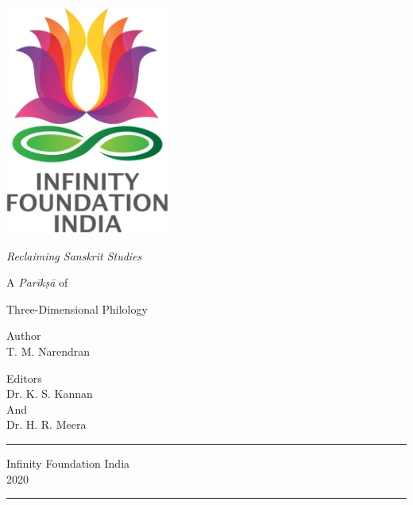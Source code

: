 \thispagestyle{empty}
\begin{center}
\includegraphics[scale=0.3]{images/logo.png}
\bigskip

{\fontsize{10}{14}\selectfont\sl
Reclaiming Sanskrit Studies
}

\bigskip
\end{center}
\medskip

\begin{center}
{{\fontsize{20}{24}\selectfont A \textit{Parīkṣā} of}}

{{\fontsize{20}{24}\selectfont Three-Dimensional Philology}}

\vfill


{\fontsize{14}{18}\selectfont 
Author\\[2pt]
T. M. Narendran}\par

\bigskip
\bigskip

{\fontsize{14}{18}\selectfont 
Editors\\[3pt]
Dr. K. S. Kannan\\
And\\[3pt]
Dr. H. R. Meera}\par
\vfill

\rule{5cm}{1pt}

{\fontsize{12}{14}\selectfont
Infinity Foundation India\\[4pt]
2020}

\rule{5cm}{1pt}
\end{center}




